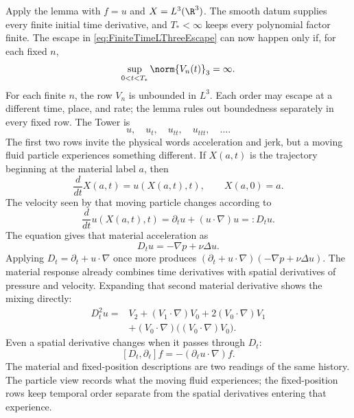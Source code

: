 Apply the lemma with \(f=u\) and \(X=L^3(\R^3)\).
The smooth datum supplies every finite initial time derivative, and \(T_*<\infty\) keeps every polynomial factor finite.
The escape in \eqref{eq:FiniteTimeLThreeEscape} can now happen only if, for each fixed \(n\),
\begin{equation}\label{eq:TemporalTowerMustEscape}
  \sup_{0<t<T_*}\norm{V_n(t)}_3=\infty.
\end{equation}
For each finite \(n\), the row \(V_n\) is unbounded in \(L^3\).
Each order may escape at a different time, place, and rate; the lemma rules out boundedness separately in every fixed row.
The Tower is
\[
  u,\quad u_t,\quad u_{tt},\quad u_{ttt},\quad\ldots.
\]
The first two rows invite the physical words acceleration and jerk, but a moving fluid particle experiences something different.
If \(X(a,t)\) is the trajectory beginning at the material label \(a\), then
\begin{equation}\label{eq:ParticleTrajectory}
  \frac d{dt}X(a,t)=u(X(a,t),t),
  \qquad
  X(a,0)=a.
\end{equation}
The velocity seen by that moving particle changes according to
\begin{equation}\label{eq:MaterialAccelerationBody}
  \frac d{dt}u(X(a,t),t)
  =\partial_tu+(u\cdot\nabla)u
  =:D_tu.
\end{equation}
The equation gives that material acceleration as
\begin{equation}\label{eq:MaterialAccelerationEquationBody}
  D_tu=-\nabla p+\nu\Delta u.
\end{equation}
Applying \(D_t=\partial_t+u\cdot\nabla\) once more produces \((\partial_t+u\cdot\nabla)(-\nabla p+\nu\Delta u)\).
The material response already combines time derivatives with spatial derivatives of pressure and velocity.
Expanding that second material derivative shows the mixing directly:
\[
  \begin{aligned}
  D_t^2u
  ={}&V_2+(V_1\cdot\nabla)V_0+2(V_0\cdot\nabla)V_1
  \\
  &+(V_0\cdot\nabla)\bigl((V_0\cdot\nabla)V_0\bigr).
  \end{aligned}
\]
Even a spatial derivative changes when it passes through \(D_t\):
\[
  [D_t,\partial_\ell]f
  =-(\partial_\ell u\cdot\nabla)f.
\]
The material and fixed-position descriptions are two readings of the same history.
The particle view records what the moving fluid experiences; the fixed-position rows keep temporal order separate from the spatial derivatives entering that experience.

